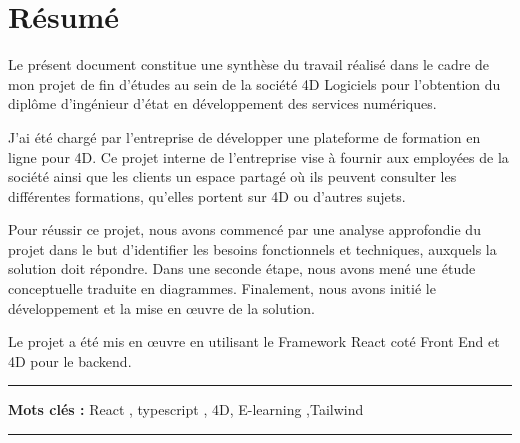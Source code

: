 \chapter*{Résumé}


\hspace{10pt}Le présent document constitue une synthèse du travail réalisé dans le cadre de mon projet de fin d’études au sein de la société 4D Logiciels pour l’obtention du diplôme d’ingénieur d’état en développement des services numériques.

\vspace{10pt}

J'ai été chargé par l'entreprise de développer une plateforme de formation en ligne pour 4D. Ce projet interne de l'entreprise vise à fournir aux employées de la société ainsi que les clients un espace partagé où ils peuvent consulter les différentes formations, qu’elles portent sur 4D ou d’autres sujets.

\vspace{10pt}

Pour réussir ce projet, nous avons commencé par une analyse approfondie du projet dans le but d’identifier les besoins fonctionnels et techniques, auxquels la solution doit répondre. Dans une seconde étape, nous avons mené une étude conceptuelle traduite en diagrammes. Finalement, nous avons initié le développement et la mise en œuvre de la solution.

\vspace{10pt}

Le projet a été mis en œuvre en utilisant le Framework React coté Front End et 4D pour le backend.

\vspace{10pt}


\noindent\rule[2pt]{\textwidth}{0.5pt}

{\textbf{Mots clés :}}
React , typescript , 4D, E-learning ,Tailwind
\\
\noindent\rule[2pt]{\textwidth}{0.5pt}